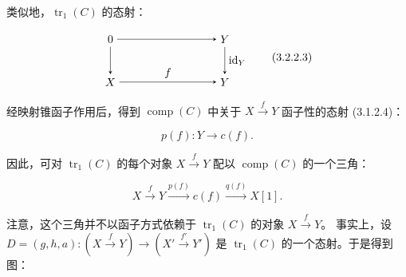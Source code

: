 \clearpage
{}%
类似地，$\operatorname{tr}_1(C)$ 的态射：

\begin{equation}
  \begin{tikzpicture}[>=stealth,baseline=(current bounding box.center)]
    \node (Z)  at (0,1.35) {$0$};
    \node (Y)  at (3.6,1.35) {$Y$};
    \node (X)  at (0,0) {$X$};
    \node (Yp) at (3.6,0) {$Y$};
    \draw[->] (Z) -- (Y);
    \draw[->] (Z) -- (X);
    \draw[->] (Y) -- node[right] {$\operatorname{id}_Y$} (Yp);
    \draw[->] (X) -- node[above] {$f$} (Yp);
  \end{tikzpicture}
  \tag{3.2.2.3}
\end{equation}

经映射锥函子作用后，得到 $\operatorname{comp}(C)$ 中关于
$X\xrightarrow{f}Y$ 函子性的态射 (3.1.2.4)：

\begin{equation}
  p(f)\colon Y\longrightarrow c(f).
  \tag{3.2.2.4}
\end{equation}

因此，可对 $\operatorname{tr}_1(C)$ 的每个对象 $X\xrightarrow{f}Y$
配以 $\operatorname{comp}(C)$ 的一个三角：

\begin{equation}
  X\xrightarrow{f}Y\xrightarrow{p(f)}c(f)\xrightarrow{q(f)}X[1].
  \tag{3.2.2.5}
\end{equation}

注意，这个三角并不以函子方式依赖于 $\operatorname{tr}_1(C)$ 的对象
$X\xrightarrow{f}Y$。
事实上，设
$D=(g,h,a)\colon(X\xrightarrow{f}Y)\longrightarrow
(X'\xrightarrow{f'}Y')$
是 $\operatorname{tr}_1(C)$ 的一个态射。于是得到图：

